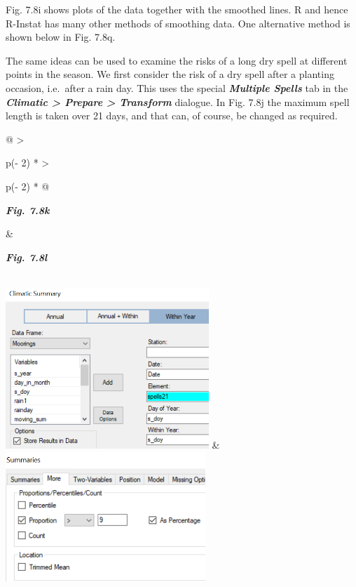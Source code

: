 \documentclass[
  letterpaper,
  DIV=11,
  numbers=noendperiod]{scrreprt}
\begin{document}
Fig. 7.8i shows plots of the data together with the smoothed lines. R
and hence R-Instat has many other methods of smoothing data. One
alternative method is shown below in Fig. 7.8q.

The same ideas can be used to examine the risks of a long dry spell at
different points in the season. We first consider the risk of a dry
spell after a planting occasion, i.e.~after a rain day. This uses the
special \textbf{\emph{Multiple Spells}} tab in the
\textbf{\emph{Climatic \textgreater{} Prepare \textgreater{} Transform}}
dialogue. In Fig. 7.8j the maximum spell length is taken over 21 days,
and that can, of course, be changed as required.

\begin{longtable}[]{@{}
  >{\raggedright\arraybackslash}p{(\columnwidth - 2\tabcolsep) * }
  >{\raggedright\arraybackslash}p{(\columnwidth - 2\tabcolsep) * }@{}}
\toprule\noalign{}
\begin{minipage}[b]{\linewidth}\raggedright
\textbf{\emph{Fig. 7.8k}}
\end{minipage} & \begin{minipage}[b]{\linewidth}\raggedright
\textbf{\emph{Fig. 7.8l}}
\end{minipage} \\
\midrule\noalign{}
\endhead
\bottomrule\noalign{}
\endlastfoot
\includegraphics[width=3.01867in,height=2.38822in]{figures/Fig7.8k.png}
&
\includegraphics[width=2.96908in,height=1.91405in]{figures/Fig7.8l.png} \\
\end{longtable}
\end{document}
